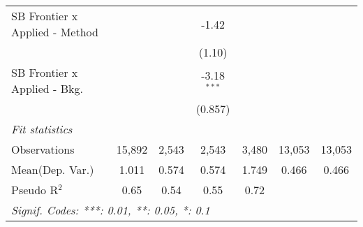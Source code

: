 \begin{tabular}{lcccccc}
   SB Frontier x Applied - Method &          &              & -1.42         &                &        &   \\   
                                  &          &              & (1.10)        &                &        &   \\   
   SB Frontier x Applied - Bkg.   &          &              & -3.18$^{***}$ &                &        &   \\   
                                  &          &              & (0.857)       &                &        &   \\   
   \midrule
   \emph{Fit statistics}\\
   Observations                   & 15,892   & 2,543        & 2,543         & 3,480          & 13,053 & 13,053\\  
Mean(Dep. Var.) & 1.011 & 0.574 & 0.574 & 1.749 & 0.466 & 0.466 \\
   Pseudo R$^2$                   & 0.65     & 0.54         & 0.55          & 0.72           &        & \\  
   \midrule \midrule
   \multicolumn{7}{l}{\emph{Signif. Codes: ***: 0.01, **: 0.05, *: 0.1}}\\
\end{tabular}
\par\endgroup
